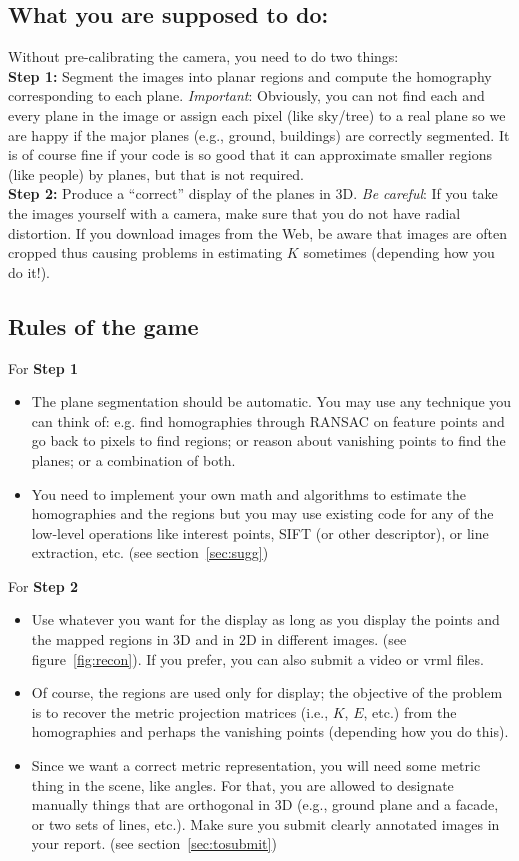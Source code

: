 \documentclass[11pt]{article}
\begin{document}
\subsection{What you are supposed to do:}
Without pre-calibrating the camera, you need to do two things:\\

{\bf Step 1:} Segment the images into planar regions and compute the homography
corresponding to each plane. {\it Important}: Obviously, you can not find each and every plane in the image or assign each pixel (like sky/tree) to a real plane so we are happy if the major planes (e.g., ground, buildings) are correctly segmented. It is of course fine if your code is so good that it can approximate smaller regions (like people) by planes, but that is not required.\\

{\bf Step 2:} Produce a ``correct'' display of the planes in 3D. {\it Be careful}: If you take the images yourself with a camera, make sure that you do not have radial distortion. If you download images from the Web, be aware that images are often cropped thus causing problems in estimating $K$ sometimes (depending how you do it!).

\subsection{Rules of the game}
For {\bf Step 1}
\begin{itemize}
\item The plane segmentation should be automatic. You may use any technique you can
think of: e.g. find homographies through RANSAC on feature points and go back to
pixels to find regions; or reason about vanishing points to find the planes; or a combination of both.
\item You need to implement your own math and algorithms to estimate the homographies
and the regions but you may use existing code for any of the low-level operations like
interest points, SIFT (or other descriptor), or line extraction, etc. (see section~\ref{sec:sugg})
\end{itemize}
For {\bf Step 2}
\begin{itemize}
\item Use whatever you want for the display as long as you display the points and the mapped regions in 3D and in 2D in different images. (see figure~\ref{fig:recon}). If you prefer, you can also submit a video or vrml files.
\item Of course, the regions are used only for display; the objective of the problem is to recover
the metric projection matrices (i.e., $K$, $E$, etc.) from the homographies and perhaps the
vanishing points (depending how you do this).
\item Since we want a correct metric representation, you will need some metric thing in the
scene, like angles. For that, you are allowed to designate manually things that are
orthogonal in 3D (e.g., ground plane and a facade, or two sets of lines, etc.). Make sure you submit clearly annotated images in your report. (see section~\ref{sec:tosubmit})
\end{itemize}
\end{document}
